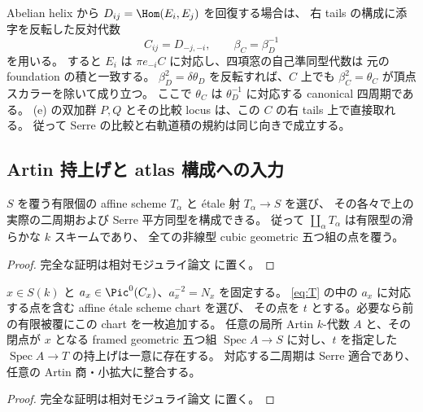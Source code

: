 \begin{remark}
Abelian helix から $D_{ij}=\Hom(E_i,E_j)$ を回復する場合は、
右 tails の構成に添字を反転した反対代数
\[
 C_{ij}=D_{-j,-i},\qquad \beta_C=\beta_D^{-1}
\]
を用いる。
すると $E_i$ は $\pi e_{-i}C$ に対応し、四項窓の自己準同型代数は
元の foundation の積と一致する。
$\beta_D^2=\delta\theta_D$ を反転すれば、$C$ 上でも
$\beta_C^2=\theta_C$ が頂点スカラーを除いて成り立つ。
ここで $\theta_C$ は $\theta_D^{-1}$ に対応する canonical 四周期である。
(e) の双加群 $P,Q$ とその比較 locus は、この $C$ の右 tails 上で直接取れる。
従って Serre の比較と右軌道積の規約は同じ向きで成立する。
\end{remark}

\subsection{Artin 持上げと atlas 構成への入力}

\begin{corollary}\label{cor:finite-type-root-chart}
$S$ を覆う有限個の affine scheme $T_\alpha$ と étale 射 $T_\alpha\to S$ を選び、
その各々で上の実際の二周期および Serre 平方同型を構成できる。
従って $\coprod_\alpha T_\alpha$ は有限型の滑らかな $k$ スキームであり、
全ての非線型 cubic geometric 五つ組の点を覆う。
\end{corollary}

\begin{proof}
完全な証明は相対モジュライ論文 \cite[\texttt{relative_picard_roots}]{QuadricModuli2026} に置く。
\end{proof}

\begin{corollary}\label{cor:all-artin-root}
$x\in S(k)$ と $a_x\in\Pic^0(C_x)$、$a_x^{-2}=N_x$ を固定する。
\eqref{eq:T} の中の $a_x$ に対応する点を含む affine étale scheme chart を選び、
その点を $t$ とする。必要なら前の有限被覆にこの chart を一枚追加する。
任意の局所 Artin $k$-代数 $A$ と、その閉点が $x$ となる framed geometric
五つ組 $\operatorname{Spec} A\to S$ に対し、$t$ を指定した $\operatorname{Spec} A\to T$ の持上げは一意に存在する。
対応する二周期は Serre 適合であり、任意の Artin 商・小拡大に整合する。
\end{corollary}

\begin{proof}
完全な証明は相対モジュライ論文 \cite[\texttt{relative_picard_roots}]{QuadricModuli2026} に置く。
\end{proof}

